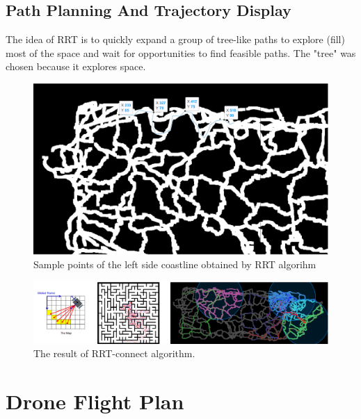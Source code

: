 \documentclass{article} %
\begin{document}
\subsection{Path Planning And Trajectory Display}
The idea of RRT is to quickly expand a group of tree-like paths to explore (fill) 
most of the space and wait for opportunities to find feasible paths. The "tree" was chosen because it explores space.

\begin{figure}[h]
    \centering
    \includegraphics[scale=0.3]{sample_point_in_left_side_coastline.png}
    \caption{Sample points of the left side coastline obtained by RRT algorihm}
\end{figure}   
\begin{figure}[h]
        \centering
        \includegraphics[scale=0.5]{RRT.png}
        \caption{The result of RRT-connect algorithm.}
    \end{figure}

\section{Drone Flight Plan}
\end{document}
